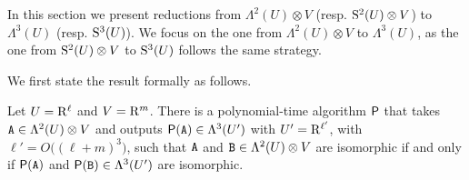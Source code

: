 In this section we present reductions from $\Lambda^2(U)\otimes V$ (resp. $\S^2(U)\otimes V$) to $\Lambda^3(U)$ (resp. $\S^3(U)$). We focus on the one from $\Lambda^2(U)\otimes V$ to $\Lambda^3(U)$, as the one from $\S^2(U)\otimes V$ to $\S^3(U)$ follows the same strategy.

We first state the result formally as follows.
\begin{theorem} \label{thm:Lambda3U}
	Let $U=\rng^\ell$ and $V=\rng^m$. There is a polynomial-time algorithm $\algprobm{P}$ that takes $\tA\in \Lambda^2(U)\otimes V$ and outputs $\algprobm{P}(\tA)\in \Lambda^3(U')$ with $U'= \rng^{\ell'}$, with $\ell'=O\big((\ell+m)^3\big)$,
	such that $\tA$ and $\tB\in \Lambda^2(U)\otimes V$ are isomorphic if and only if $\algprobm{P}(\tA)$ and $\algprobm{P}(\tB)\in \Lambda^3(U')$ are isomorphic.
\end{theorem}
